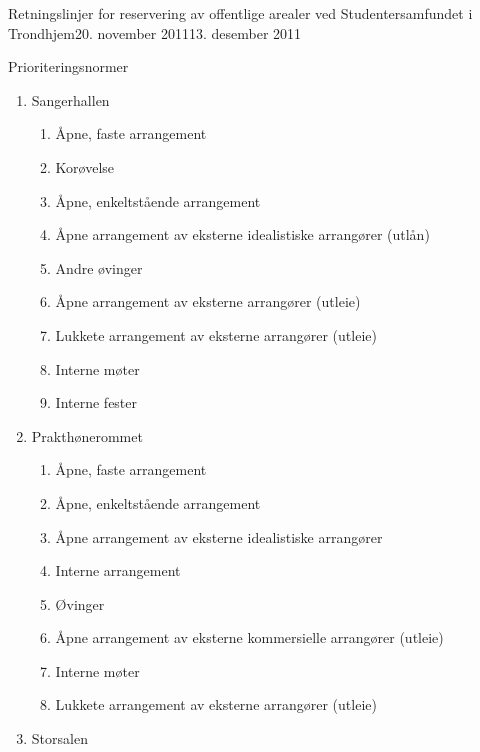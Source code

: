 \documentclass[fsbok.tex]{subfiles}
\begin{document}
\begin{instruks}{Retningslinjer for reservering av offentlige arealer
    ved Studentersamfundet i Trondhjem}{20. november 2011}{13. desember 2011}
\begin{instruksledd}{Prioriteringsnormer}
\begin{enumerate}
\begin{enumerate}
\begin{enumerate}
                            \item Lukkete arrangementer av eksterne arrangører (utleie)
                            \item Interne fester
                        \end{enumerate}
                    \item Sangerhallen
                        \begin{enumerate}
                            \item  Åpne, faste arrangement
                            \item Korøvelse
                            \item  Åpne, enkeltstående arrangement
                            \item Åpne arrangement av eksterne idealistiske arrangører (utlån)
                            \item Andre øvinger
                            \item Åpne arrangement av eksterne arrangører (utleie)
                            \item Lukkete arrangement av eksterne arrangører (utleie)
                            \item Interne møter
                            \item Interne fester
                        \end{enumerate}
                    \item Prakthønerommet
                        \begin{enumerate}
                            \item Åpne, faste arrangement
                            \item Åpne, enkeltstående arrangement
                            \item Åpne arrangement av eksterne idealistiske arrangører
                            \item Interne arrangement
                            \item Øvinger
                            \item Åpne arrangement av eksterne kommersielle arrangører (utleie)
                            \item Interne møter
                            \item Lukkete arrangement av eksterne arrangører (utleie)
                        \end{enumerate}
                    \item Storsalen

\end{enumerate}
\end{enumerate}
\end{instruksledd}
\end{instruks}
\end{document}

